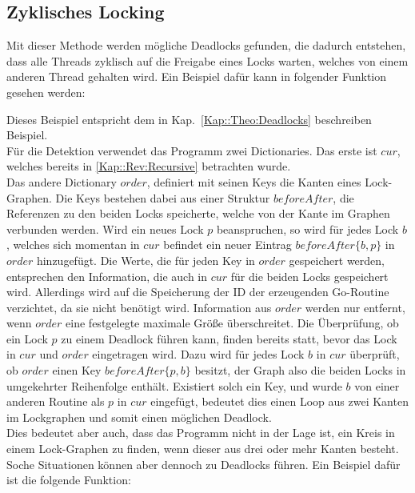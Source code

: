 \subsection{Zyklisches Locking}\label{Kap::Rev:Cyclic}
Mit dieser Methode werden mögliche Deadlocks gefunden, die dadurch entstehen,
dass alle Threads zyklisch auf die Freigabe eines Locks warten, welches von 
einem anderen Thread gehalten wird. Ein Beispiel dafür kann in folgender Funktion
gesehen werden:
\begin{figure}[H]
    
\end{figure}
Dieses Beispiel entspricht dem in Kap.~\ref*{Kap::Theo:Deadlocks} beschreiben 
Beispiel.\\
Für die Detektion verwendet das Programm zwei Dictionaries. Das erste ist $cur$, 
welches bereits in \ref{Kap::Rev:Recursive} betrachten wurde.\\
Das andere Dictionary $order$, definiert mit seinen Keys die Kanten eines Lock-Graphen.
Die Keys bestehen dabei aus einer Struktur $beforeAfter$, die Referenzen zu den beiden
Locks speicherte, welche von der Kante im Graphen verbunden werden.
Wird ein neues Lock $p$ beanspruchen, so wird für 
jedes Lock $b$, welches sich momentan in $cur$ befindet ein  
neuer Eintrag $beforeAfter\{b, p\}$ in $order$ hinzugefügt. 
Die Werte, die für jeden Key in $order$ gespeichert werden, entsprechen 
den Information, die auch in $cur$ für die beiden Locks gespeichert wird. Allerdings 
wird auf die Speicherung der ID der erzeugenden Go-Routine verzichtet, da sie 
nicht benötigt wird.
Information aus $order$ werden nur entfernt, wenn $order$ eine festgelegte 
maximale Größe überschreitet. 
Die Überprüfung, ob ein Lock $p$ zu einem Deadlock führen kann, finden bereits statt,
bevor das Lock in $cur$ und $order$ eingetragen wird. Dazu wird für jedes Lock
$b$ in $cur$ überprüft,
ob $order$ einen Key $beforeAfter\{p, b\}$ besitzt, der Graph also die beiden 
Locks in 
umgekehrter Reihenfolge enthält. Existiert solch ein Key, und wurde $b$ 
von einer anderen Routine als $p$ in $cur$ eingefügt, bedeutet dies einen 
Loop aus zwei Kanten im Lockgraphen und somit einen möglichen Deadlock.\\
Dies bedeutet aber auch, dass das Programm nicht in der Lage ist, ein Kreis 
in einem Lock-Graphen zu finden, wenn dieser aus drei oder mehr Kanten besteht.
Soche Situationen können aber dennoch zu Deadlocks führen. Ein Beispiel dafür 
ist die folgende Funktion:
\begin{figure}[H]
    
\end{figure}
